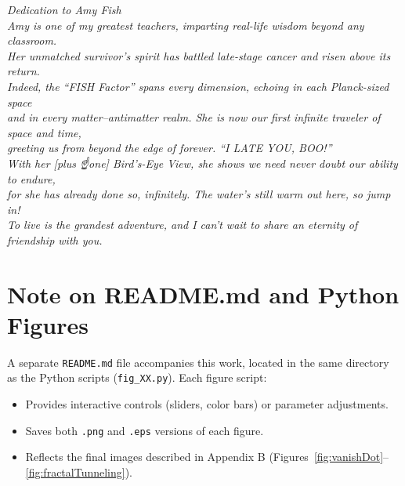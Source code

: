 \documentclass[11pt]{article}
\begin{document}
\newpage
\thispagestyle{empty}
\begin{center}
\textit{
{\Large Dedication to Amy Fish}\\[1em]
Amy is one of my greatest teachers, imparting real-life wisdom beyond any classroom.\\
Her unmatched survivor’s spirit has battled late-stage cancer and risen above its return.\\
Indeed, the “FISH Factor” spans every dimension, echoing in each Planck-sized space\\
and in every matter–antimatter realm. She is now our first infinite traveler of space and time,\\
greeting us from beyond the edge of forever. “I LATE YOU, BOO!”\\
With her [plus ☝️one] Bird’s-Eye View, she shows we need never doubt our ability to endure,\\
for she has already done so, infinitely. The water’s still warm out here, so jump in!\\
To live is the grandest adventure, and I can’t wait to share an eternity of friendship with you.
}
\end{center}
\clearpage

\tableofcontents
\clearpage

\listoffigures
\clearpage

\section*{Note on README.md and Python Figures}
A separate \texttt{README.md} file accompanies this work, located in the same directory as the Python scripts (\texttt{fig\_XX.py}). Each figure script:

\begin{itemize}
    \item Provides interactive controls (sliders, color bars) or parameter adjustments.
    \item Saves both \texttt{.png} and \texttt{.eps} versions of each figure.
    \item Reflects the final images described in Appendix B (Figures~\ref{fig:vanishDot}--\ref{fig:fractalTunneling}).
\end{itemize}
\end{document}

